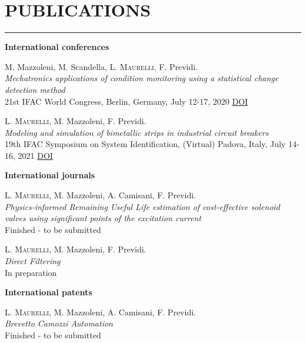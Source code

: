 \documentclass[10pt]{article}
\newcommand{\cvsection}[1]{\section*{\centering\normalsize\uppercase{#1}}\vspace{-16pt}\rule{\linewidth}{0.2pt}\vspace{6pt}}
\begin{document}

\cvsection{publications}

\textbf{International conferences}
\begin{enumerate}[label={[C0{\arabic*}]}]
	\setlength\itemsep{-3pt}
	\item \label{c2020}M. Mazzoleni, M. Scandella, \textsc{L. Maurelli}, F. Previdi.\\
	\textit{Mechatronics applications of condition monitoring using a statistical change detection method}\\
	21st IFAC World Congress, Berlin, Germany, July 12-17, 2020 \hfill \href{https://doi.org/10.1016/j.ifacol.2020.12.100}{DOI}
	\item \label{c2021}\textsc{L. Maurelli}, M. Mazzoleni, F. Previdi.\\
	\textit{Modeling and simulation of bimetallic strips in industrial circuit breakers}\\
	19th IFAC Symposium on System Identification, (Virtual) Padova, Italy, July 14-16, 2021 \hfill \href{https://doi.org/10.1016/j.ifacol.2021.08.460}{DOI}
\end{enumerate}

\textbf{International journals}
\begin{enumerate}[label={[J0{\arabic*}]}]
	\setlength\itemsep{-3pt}
	\item \label{j2022}\textsc{L. Maurelli}, M. Mazzoleni, A. Camisani, F. Previdi.\\
	\textit{Physics-informed Remaining Useful Life estimation of cost-effective solenoid
	valves using significant points of the excitation current}\\
	Finished - to be submitted
	\item \label{j02}\textsc{L. Maurelli}, M. Mazzoleni, F. Previdi.\\
	\textit{Direct Filtering}\\
	In preparation
\end{enumerate}

\textbf{International patents}
\begin{enumerate}[label={[P0{\arabic*}]}]
	\setlength\itemsep{-3pt}
	\item \label{p2022}\textsc{L. Maurelli}, M. Mazzoleni, A. Camisani, F. Previdi.\\
	\textit{Brevetto Camozzi Automation}\\
	Finished - to be submitted
\end{enumerate}
\clearpage
\end{document}
